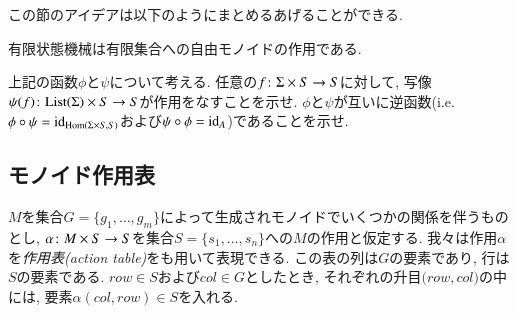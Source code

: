 この節のアイデアは以下のようにまとめるあげることができる.
\begin{slogan}
有限状態機械は有限集合への自由モノイドの作用である.
\end{slogan}

\begin{exercise}
上記の函数$\phi$と$\psi$について考える.
\sexc 任意の$f\colon\Sigma\times S\rightarrow S$に対して, 写像$\psi(f)\taking\List(\Sigma)\times S\to S$が作用をなすことを示せ.
\next $\phi$と$\psi$が互いに逆函数(i.e. $\phi\circ\psi=\id_{\Hom(\Sigma\times S,S)}$および$\psi\circ\phi=\id_{A}$)であることを示せ.
\endsexc
\end{exercise}


\subsection{モノイド作用表}\label{sec:monoid action table}


$M$を集合$G=\{g_1,\ldots,g_m\}$によって生成されモノイドでいくつかの関係を伴うものとし, $\alpha\colon M\times S\rightarrow S$を集合$S=\{s_1,\ldots,s_n\}$への$M$の作用と仮定する. 我々は作用$\alpha$を\emph{作用表(action table)}をも用いて表現できる. この表の列は$G$の要素であり, 行は$S$の要素である. $\mathit{row}\in S$および$\mathit{col}\in G$としたとき, それぞれの升目$(\mathit{row},\mathit{col)}$の中には, 要素$\alpha(\mathit{col},\mathit{row})\in S$を入れる. 

